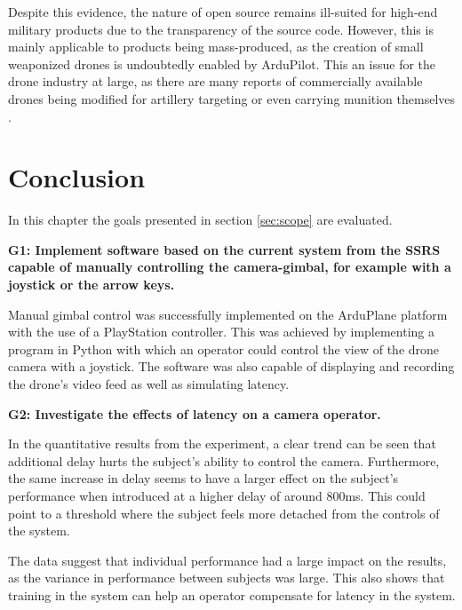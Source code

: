 \documentclass[nofilelist]{cslthse-msc}
\begin{document}
Despite this evidence, the nature of open source remains ill-suited for high-end military products due to the transparency of the source code. However, this is mainly applicable to products being mass-produced, as the creation of small weaponized drones is undoubtedly enabled by ArduPilot. This an issue for the drone industry at large, as there are many reports of commercially available drones being modified for artillery targeting or even carrying munition themselves \cite{drones-ukraine}. 

\chapter{Conclusion}
In this chapter the goals presented in section \ref{sec:scope} are evaluated.

\begin{description}

   \item \textbf{G1: Implement software based on the current system from the SSRS capable of manually controlling the camera-gimbal, for example with a joystick or the arrow keys.} 

   \item
   Manual gimbal control was successfully implemented on the ArduPlane platform with the use of a PlayStation controller. This was achieved by implementing a program in Python with which an operator could control the view of the drone camera with a joystick. The software was also capable of displaying and recording the drone's video feed as well as simulating latency.

   \item \textbf{G2: Investigate the effects of latency on a camera operator.} 

   \item
   In the quantitative results from the experiment, a clear trend can be seen that additional delay hurts the subject's ability to control the camera. Furthermore, the same increase in delay seems to have a larger effect on the subject's performance when introduced at a higher delay of around 800ms. This could point to a threshold where the subject feels more detached from the controls of the system.  
   
   The data suggest that individual performance had a large impact on the results, as the variance in performance between subjects was large. This also shows that training in the system can help an operator compensate for latency in the system.
   

\end{description}
\end{document}
